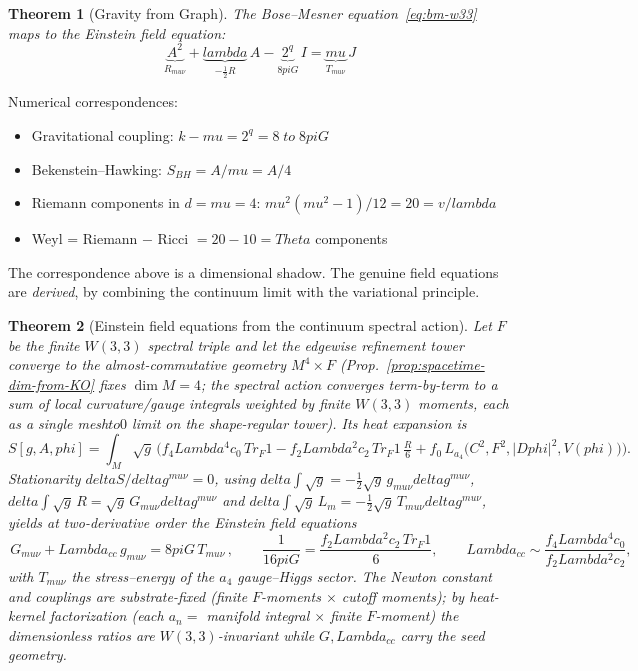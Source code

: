 \documentclass[12pt,a4paper]{article}
\def\mathrm#1{#1}%
\def\mathcal#1{#1}%
\def\delta{delta}%
\def\lambda{lambda}%
\def\Lambda{Lambda}%
\def\mu{mu}%
\def\phi{phi}%
\def\pi{pi}%
\def\Theta{Theta}%
\def\to{ to }%
\newtheorem{theorem}{Theorem}[section]
\theoremstyle{definition}
\begin{document}
\label{sec:einstein}

\begin{theorem}[Gravity from Graph]
The Bose--Mesner equation~\eqref{eq:bm-w33} maps to the Einstein field equation:
\begin{equation}
\underbrace{A^2}_{\displaystyle R_{\mu\nu}}
+ \underbrace{\lambda}_{\displaystyle -\tfrac{1}{2}R}\,A
- \underbrace{2^q}_{\displaystyle 8\pi G}\,I
= \underbrace{\mu}_{\displaystyle T_{\mu\nu}}\,J
\end{equation}
\end{theorem}

\noindent Numerical correspondences:
\begin{itemize}[nosep]
\item Gravitational coupling: $k-\mu = 2^q = 8 \;\to\; 8\pi G$
\item Bekenstein--Hawking: $S_{BH} = A/\mu = A/4$
\item Riemann components in $d=\mu=4$:
  $\mu^2(\mu^2-1)/12 = 20 = v/\lambda$
\item Weyl = Riemann $-$ Ricci $= 20-10 = \Theta$ components
\end{itemize}

The correspondence above is a dimensional shadow. The genuine field equations
are \emph{derived}, by combining the continuum limit with the variational
principle.

\begin{theorem}[Einstein field equations from the continuum spectral action]
\label{thm:einstein-from-spectral-action}
Let $F$ be the finite $W(3,3)$ spectral triple and let the edgewise refinement
tower converge to the almost-commutative geometry $M^4\times F$
(Prop.~\ref{prop:spacetime-dim-from-KO} fixes $\dim M=4$; the spectral action
converges term-by-term to a sum of local curvature/gauge integrals weighted by
finite $W(3,3)$ moments, each as a single mesh$\to 0$ limit on the shape-regular
tower). Its heat expansion is
\[
  S[g,A,\phi]=\int_M\!\sqrt{g}\,\Big(f_4\Lambda^4 c_0\,\mathrm{Tr}_F 1
  -f_2\Lambda^2 c_2\,\mathrm{Tr}_F 1\,\tfrac{R}{6}
  +f_0\,\mathcal L_{a_4}\!\big(C^2,F^2,|D\phi|^2,V(\phi)\big)\Big).
\]
Stationarity $\delta S/\delta g^{\mu\nu}=0$, using
$\delta\!\int\!\sqrt g=-\tfrac12\sqrt g\,g_{\mu\nu}\delta g^{\mu\nu}$,
$\delta\!\int\!\sqrt g\,R=\sqrt g\,G_{\mu\nu}\delta g^{\mu\nu}$ and
$\delta\!\int\!\sqrt g\,\mathcal L_m=-\tfrac12\sqrt g\,T_{\mu\nu}\delta g^{\mu\nu}$,
yields at two-derivative order the Einstein field equations
\[
  \boxed{\,G_{\mu\nu}+\Lambda_{\mathrm{cc}}\,g_{\mu\nu}=8\pi G\,T_{\mu\nu}\,},
  \qquad
  \frac{1}{16\pi G}=\frac{f_2\Lambda^2 c_2\,\mathrm{Tr}_F 1}{6},\qquad
  \Lambda_{\mathrm{cc}}\sim\frac{f_4\Lambda^4 c_0}{f_2\Lambda^2 c_2},
\]
with $T_{\mu\nu}$ the stress--energy of the $a_4$ gauge--Higgs sector. The Newton
constant and couplings are substrate-fixed (finite $F$-moments $\times$ cutoff
moments); by heat-kernel factorization (each $a_n=$ manifold integral $\times$
finite $F$-moment) the dimensionless ratios are $W(3,3)$-invariant while
$G,\Lambda_{\mathrm{cc}}$ carry the seed geometry.
\end{theorem}
\end{document}
